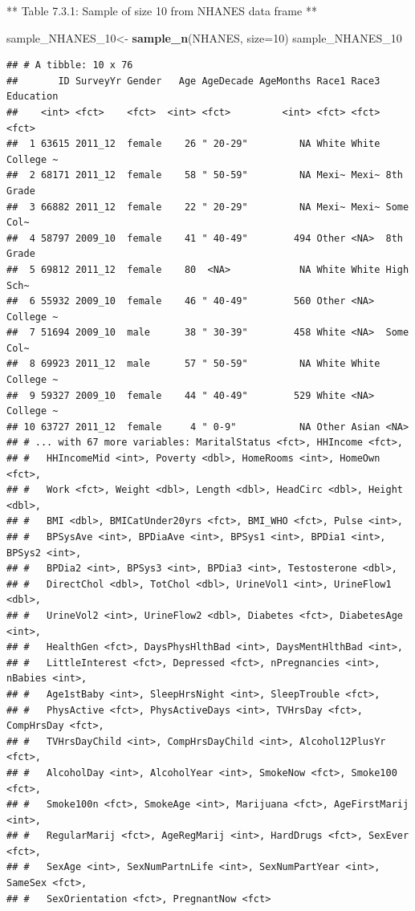 \documentclass[
]{book}
\newenvironment{Shaded}{\begin{snugshade}}{\end{snugshade}}
\newcommand{\DataTypeTok}[1]{\textcolor[rgb]{0.13,0.29,0.53}{#1}}
\newcommand{\DecValTok}[1]{\textcolor[rgb]{0.00,0.00,0.81}{#1}}
\newcommand{\KeywordTok}[1]{\textcolor[rgb]{0.13,0.29,0.53}{\textbf{#1}}}
\newcommand{\NormalTok}[1]{#1}
\newcommand{\StringTok}[1]{\textcolor[rgb]{0.31,0.60,0.02}{#1}}
\begin{document}
** Table 7.3.1: Sample of size 10 from NHANES data frame **

\begin{Shaded}
\begin{Highlighting}[]
\NormalTok{sample_NHANES_}\DecValTok{10}\NormalTok{<-}
\StringTok{  }\KeywordTok{sample_n}\NormalTok{(NHANES, }\DataTypeTok{size=}\DecValTok{10}\NormalTok{)}
\NormalTok{sample_NHANES_}\DecValTok{10}
\end{Highlighting}
\end{Shaded}

\begin{verbatim}
## # A tibble: 10 x 76
##       ID SurveyYr Gender   Age AgeDecade AgeMonths Race1 Race3 Education
##    <int> <fct>    <fct>  <int> <fct>         <int> <fct> <fct> <fct>    
##  1 63615 2011_12  female    26 " 20-29"         NA White White College ~
##  2 68171 2011_12  female    58 " 50-59"         NA Mexi~ Mexi~ 8th Grade
##  3 66882 2011_12  female    22 " 20-29"         NA Mexi~ Mexi~ Some Col~
##  4 58797 2009_10  female    41 " 40-49"        494 Other <NA>  8th Grade
##  5 69812 2011_12  female    80  <NA>            NA White White High Sch~
##  6 55932 2009_10  female    46 " 40-49"        560 Other <NA>  College ~
##  7 51694 2009_10  male      38 " 30-39"        458 White <NA>  Some Col~
##  8 69923 2011_12  male      57 " 50-59"         NA White White College ~
##  9 59327 2009_10  female    44 " 40-49"        529 White <NA>  College ~
## 10 63727 2011_12  female     4 " 0-9"           NA Other Asian <NA>     
## # ... with 67 more variables: MaritalStatus <fct>, HHIncome <fct>,
## #   HHIncomeMid <int>, Poverty <dbl>, HomeRooms <int>, HomeOwn <fct>,
## #   Work <fct>, Weight <dbl>, Length <dbl>, HeadCirc <dbl>, Height <dbl>,
## #   BMI <dbl>, BMICatUnder20yrs <fct>, BMI_WHO <fct>, Pulse <int>,
## #   BPSysAve <int>, BPDiaAve <int>, BPSys1 <int>, BPDia1 <int>, BPSys2 <int>,
## #   BPDia2 <int>, BPSys3 <int>, BPDia3 <int>, Testosterone <dbl>,
## #   DirectChol <dbl>, TotChol <dbl>, UrineVol1 <int>, UrineFlow1 <dbl>,
## #   UrineVol2 <int>, UrineFlow2 <dbl>, Diabetes <fct>, DiabetesAge <int>,
## #   HealthGen <fct>, DaysPhysHlthBad <int>, DaysMentHlthBad <int>,
## #   LittleInterest <fct>, Depressed <fct>, nPregnancies <int>, nBabies <int>,
## #   Age1stBaby <int>, SleepHrsNight <int>, SleepTrouble <fct>,
## #   PhysActive <fct>, PhysActiveDays <int>, TVHrsDay <fct>, CompHrsDay <fct>,
## #   TVHrsDayChild <int>, CompHrsDayChild <int>, Alcohol12PlusYr <fct>,
## #   AlcoholDay <int>, AlcoholYear <int>, SmokeNow <fct>, Smoke100 <fct>,
## #   Smoke100n <fct>, SmokeAge <int>, Marijuana <fct>, AgeFirstMarij <int>,
## #   RegularMarij <fct>, AgeRegMarij <int>, HardDrugs <fct>, SexEver <fct>,
## #   SexAge <int>, SexNumPartnLife <int>, SexNumPartYear <int>, SameSex <fct>,
## #   SexOrientation <fct>, PregnantNow <fct>
\end{verbatim}
\end{document}
